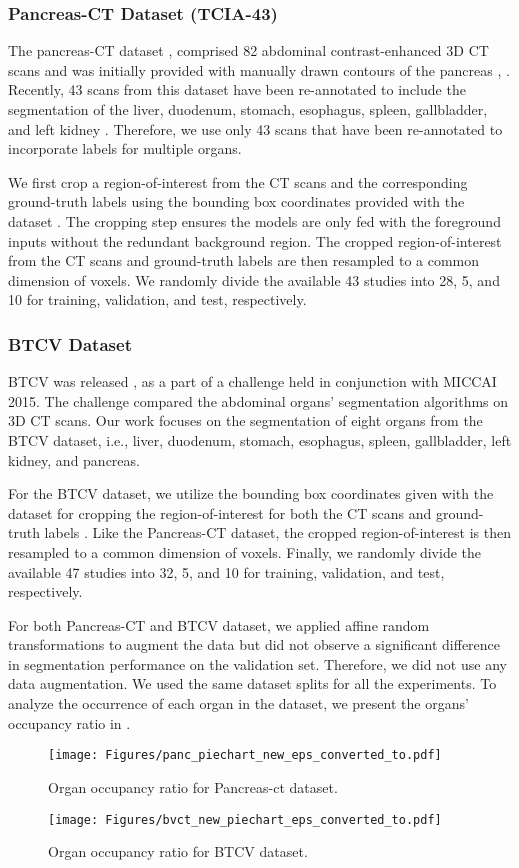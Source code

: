 \documentclass[final,5p,times,twocolumn]{elsarticle}
\begin{document}
\subsubsection{Pancreas-CT Dataset (TCIA-43)}
The pancreas-CT dataset \cite{Roth2016}, \cite{RothLFSLTS15} comprised 82 abdominal contrast-enhanced 3D CT scans and was initially provided with manually drawn contours of the pancreas \cite{Clark2013}, \cite{RothLFSLTS15}. Recently, 43 scans from this dataset have been re-annotated to include the segmentation of the liver, duodenum, stomach, esophagus, spleen, gallbladder, and left kidney \cite{Gibson2018}. Therefore, we use only 43 scans that have been re-annotated to incorporate labels for multiple organs. 

We first crop a region-of-interest from the CT scans and the corresponding ground-truth labels using the bounding box coordinates provided with the dataset \cite{Gibson2018}. The cropping step ensures the models are only fed with the foreground inputs without the redundant background region. The cropped region-of-interest from the CT scans and ground-truth labels are then resampled to a common dimension of  voxels. We randomly divide the available 43 studies into 28, 5, and 10 for training, validation, and test, respectively.
\subsubsection{BTCV Dataset}
BTCV was released \cite{landmanbvc}, \cite{xu2016evaluation} as a part of a challenge held in conjunction with MICCAI 2015. The challenge compared the abdominal organs' segmentation algorithms on 3D CT scans. Our work focuses on the segmentation of eight organs from the BTCV dataset, i.e., liver, duodenum, stomach, esophagus, spleen, gallbladder, left kidney, and pancreas. 

For the BTCV dataset, we utilize the bounding box coordinates given with the dataset for cropping the region-of-interest for both the CT scans and ground-truth labels \cite{Gibson2018}. Like the Pancreas-CT dataset, the cropped region-of-interest is then resampled to a common dimension of  voxels. Finally, we randomly divide the available 47 studies into 32, 5, and 10 for training, validation, and test, respectively. 

For both Pancreas-CT and BTCV dataset, we applied affine random transformations to augment the data but did not observe a significant difference in segmentation performance on the validation set. Therefore, we did not use any data augmentation. We used the same dataset splits for all the experiments. To analyze the occurrence of each organ in the dataset, we present the organs' occupancy ratio in .
\begin{figure}[!hbt]
\centering
\texttt{[image: Figures/panc\_piechart\_new\_eps\_converted\_to.pdf]} 
\caption{Organ occupancy ratio for Pancreas-ct dataset.}
\label{fig:organ_btvc}
\end{figure}
\begin{figure}[!hbt]
\centering
\texttt{[image: Figures/bvct\_new\_piechart\_eps\_converted\_to.pdf]} 
\caption{Organ occupancy ratio for BTCV dataset.}
\label{fig:organ_panc}
\end{figure}
\end{document}
